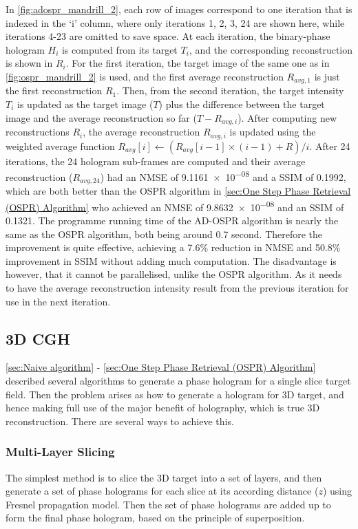 In \cref{fig:adospr_mandrill_2}, each row of images correspond to one iteration that is indexed in the `i' column, where only iterations 1, 2, 3, 24 are shown here, while iterations 4-23 are omitted to save space. At each iteration, the binary-phase hologram $H_i$ is computed from its target $T_i$, and the corresponding reconstruction is shown in $R_i$. For the first iteration, the target image of the same one as in \cref{fig:ospr_mandrill_2} is used, and the first average reconstruction $R_{avg, 1}$ is just the first reconstruction $R_1$. Then, from the second iteration, the target intensity $T_i$ is updated as the target image ($T$) plus the difference between the target image and the average reconstruction so far ($T-R_{avg, i}$). After computing new reconstructions $R_i$, the average reconstruction $R_{avg, i}$ is updated using the weighted average function $R_{avg}[i] \gets (R_{avg}[i-1] \times (i-1) + R)/i$. After 24 iterations, the 24 hologram sub-frames are computed and their average reconstruction ($R_{avg, 24}$) had an NMSE of \num{9.1161e-08} and a SSIM of 0.1992, which are both better than the OSPR algorithm in \cref{sec:One Step Phase Retrieval (OSPR) Algorithm} who achieved an NMSE of \num{9.8632e-08} and an SSIM of 0.1321. The programme running time of the AD-OSPR algorithm is nearly the same as the OSPR algorithm, both being around 0.7 second. Therefore the improvement is quite effective, achieving a 7.6\% reduction in NMSE and 50.8\% improvement in SSIM without adding much computation. The disadvantage is however, that it cannot be parallelised, unlike the OSPR algorithm. As it needs to have the average reconstruction intensity result from the previous iteration for use in the next iteration.

\subsection{3D CGH}
\cref{sec:Naive algorithm} - \cref{sec:One Step Phase Retrieval (OSPR) Algorithm} described several algorithms to generate a phase hologram for a single slice target field. Then the problem arises as how to generate a hologram for 3D target, and hence making full use of the major benefit of holography, which is true 3D reconstruction. There are several ways to achieve this.

\subsubsection{Multi-Layer Slicing}
The simplest method is to slice the 3D target into a set of layers, and then generate a set of phase holograms for each slice at its according distance ($z$) using Fresnel propagation model. Then the set of phase holograms are added up to form the final phase hologram, based on the principle of superposition.

